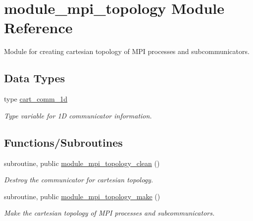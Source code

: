\hypertarget{namespacemodule__mpi__topology}{}\section{module\+\_\+mpi\+\_\+topology Module Reference}
\label{namespacemodule__mpi__topology}


Module for creating cartesian topology of M\+PI processes and subcommunicators.  


\subsection*{Data Types}
\begin{DoxyCompactItemize}
\item 
type \mbox{\hyperlink{structmodule__mpi__topology_1_1cart__comm__1d}{cart\+\_\+comm\+\_\+1d}}
\begin{DoxyCompactList}\small\item\em Type variable for 1D communicator information. \end{DoxyCompactList}\end{DoxyCompactItemize}
\subsection*{Functions/\+Subroutines}
\begin{DoxyCompactItemize}
\item 
subroutine, public \mbox{\hyperlink{namespacemodule__mpi__topology_aba41ff8d55ee4cd7371e7165ed1a3316}{module\+\_\+mpi\+\_\+topology\+\_\+clean}} ()
\begin{DoxyCompactList}\small\item\em Destroy the communicator for cartesian topology. \end{DoxyCompactList}\item 
subroutine, public \mbox{\hyperlink{namespacemodule__mpi__topology_a162ac095bb487254991dd12ad5ac8935}{module\+\_\+mpi\+\_\+topology\+\_\+make}} ()
\begin{DoxyCompactList}\small\item\em Make the cartesian topology of M\+PI processes and subcommunicators. \end{DoxyCompactList}\end{DoxyCompactItemize}
